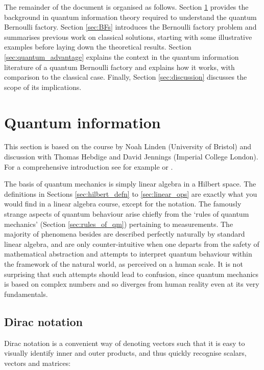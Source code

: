 \documentclass{article}
\theoremstyle{definition}
\begin{document}

The remainder of the document is organised as follows.
Section \ref{sec:quantum_info} provides the background in quantum information theory required to understand the quantum Bernoulli factory. 
Section \ref{sec:BFs} introduces the Bernoulli factory problem and summarises previous work on classical solutions, starting with some illustrative examples before laying down the theoretical results.
Section \ref{sec:quantum_advantage} explains the context in the quantum information literature of a quantum Bernoulli factory and explains how it works, with comparison to the classical case.
Finally, Section \ref{sec:discussion} discusses the scope of its implications.

\section{Quantum information}\label{sec:quantum_info}
This section is based on the course by Noah Linden (University of Bristol) and discussion with Thomas Hebdige and David Jennings (Imperial College London). For a comprehensive introduction see for example \citet{nielsen2002} or \citet{wilde2013}.

The basis of quantum mechanics is simply linear algebra in a Hilbert space. The definitions in Sections \ref{sec:hilbert_defn} to \ref{sec:linear_ops} are exactly what you would find in a linear algebra course, except for the notation. 
The famously strange aspects of quantum behaviour arise chiefly from the `rules of quantum mechanics' (Section \ref{sec:rules_of_qm}) pertaining to measurements. The majority of phenomena besides are described perfectly naturally by standard linear algebra, and are only counter-intuitive when one departs from the safety of mathematical abstraction and attempts to interpret quantum behaviour within the framework of the natural world, as perceived on a human scale. 
It is not surprising that such attempts should lead to confusion, since quantum mechanics is based on complex numbers and so diverges from human reality even at its very fundamentals.

\subsection{Dirac notation}
Dirac notation is a convenient way of denoting vectors such that it is easy to visually identify inner and outer products, and thus quickly recognise scalars, vectors and matrices:
\end{document}
